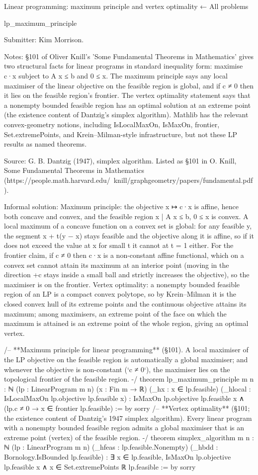Linear programming: maximum principle and vertex optimality
← All problems

lp_maximum_principle

Submitter: Kim Morrison.

Notes: §101 of Oliver Knill's 'Some Fundamental Theorems in Mathematics' gives two structural facts for linear programs in standard inequality form: maximise c·x subject to A x ≤ b and 0 ≤ x. The maximum principle says any local maximiser of the linear objective on the feasible region is global, and if c ≠ 0 then it lies on the feasible region's frontier. The vertex optimality statement says that a nonempty bounded feasible region has an optimal solution at an extreme point (the existence content of Dantzig's simplex algorithm). Mathlib has the relevant convex-geometry notions, including IsLocalMaxOn, IsMaxOn, frontier, Set.extremePoints, and Krein–Milman-style infrastructure, but not these LP results as named theorems.

Source: G. B. Dantzig (1947), simplex algorithm. Listed as §101 in O. Knill, Some Fundamental Theorems in Mathematics (https://people.math.harvard.edu/~knill/graphgeometry/papers/fundamental.pdf).

Informal solution: Maximum principle: the objective x ↦ c·x is affine, hence both concave and convex, and the feasible region {x | A x ≤ b, 0 ≤ x} is convex. A local maximum of a concave function on a convex set is global: for any feasible y, the segment x + t(y − x) stays feasible and the objective along it is affine, so if it does not exceed the value at x for small t it cannot at t = 1 either. For the frontier claim, if c ≠ 0 then c·x is a non-constant affine functional, which on a convex set cannot attain its maximum at an interior point (moving in the direction +c stays inside a small ball and strictly increases the objective), so the maximiser is on the frontier. Vertex optimality: a nonempty bounded feasible region of an LP is a compact convex polytope, so by Krein–Milman it is the closed convex hull of its extreme points and the continuous objective attains its maximum; among maximisers, an extreme point of the face on which the maximum is attained is an extreme point of the whole region, giving an optimal vertex.

/-- **Maximum principle for linear programming** (§101). A local maximiser of
the LP objective on the feasible region is automatically a global maximiser; and
whenever the objective is non-constant (`c ≠ 0`), the maximiser lies on the
topological frontier of the feasible region. -/
theorem lp_maximum_principle {m n : ℕ} (lp : LinearProgram m n)
    (x : Fin m → ℝ) (_hx : x ∈ lp.feasible)
    (_hlocal : IsLocalMaxOn lp.objective lp.feasible x) :
    IsMaxOn lp.objective lp.feasible x ∧
      (lp.c ≠ 0 → x ∈ frontier lp.feasible) := by
  sorry
/-- **Vertex optimality** (§101; the existence content of Dantzig's 1947 simplex
algorithm). Every linear program with a nonempty bounded feasible region admits a
global maximiser that is an extreme point (vertex) of the feasible region. -/
theorem simplex_algorithm {m n : ℕ} (lp : LinearProgram m n)
    (_hfeas : lp.feasible.Nonempty) (_hbdd : Bornology.IsBounded lp.feasible) :
    ∃ x ∈ lp.feasible, IsMaxOn lp.objective lp.feasible x ∧
      x ∈ Set.extremePoints ℝ lp.feasible := by
  sorry

